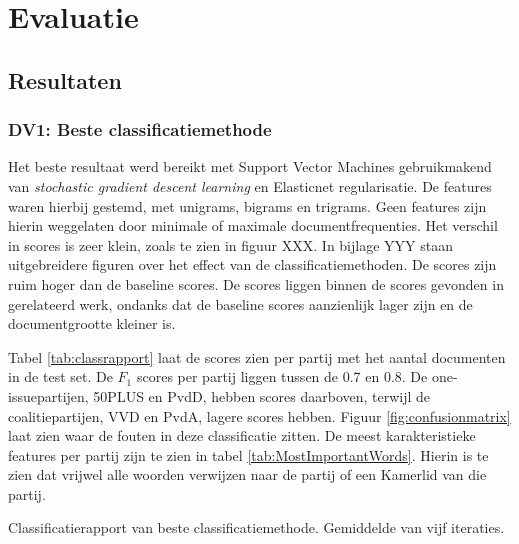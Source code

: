 \section{Evaluatie}
\label{sec:eva}

\subsection{Resultaten}

\subsubsection{DV1: Beste classificatiemethode}
Het beste resultaat werd bereikt met Support Vector Machines gebruikmakend van \textit{stochastic gradient descent learning} en Elasticnet regularisatie. De features waren hierbij gestemd, met unigrams, bigrams en trigrams. Geen features zijn hierin weggelaten door minimale of maximale documentfrequenties. Het verschil in scores is zeer klein, zoals te zien in figuur XXX. In bijlage YYY staan uitgebreidere figuren over het effect van de classificatiemethoden. De scores zijn ruim hoger dan de baseline scores. De scores liggen binnen de scores gevonden in gerelateerd werk, ondanks dat de baseline scores aanzienlijk lager zijn en de documentgrootte kleiner is.\par
Tabel \ref{tab:classrapport} laat de scores zien per partij met het aantal documenten in de test set. De $F_1$ scores per partij liggen tussen de 0.7 en 0.8. De one-issuepartijen, 50PLUS en PvdD, hebben scores daarboven, terwijl de coalitiepartijen, VVD en PvdA, lagere scores hebben. Figuur \ref{fig:confusionmatrix} laat zien waar de fouten in deze classificatie zitten. De meest karakteristieke features per partij zijn te zien in tabel \ref{tab:MostImportantWords}. Hierin is te zien dat vrijwel alle woorden verwijzen naar de partij of een Kamerlid van die partij.\par

\begin{table}[H]
\caption{Classificatierapport van beste classificatiemethode. Gemiddelde van vijf iteraties.}
\label{tab:classrapport}
\centering

\end{table}



